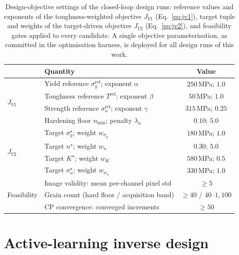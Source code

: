 \documentclass[preprint,12pt]{elsarticle}
\begin{document}
\begin{table}[!t]
\centering
\caption{Design-objective settings of the closed-loop design runs: reference values and exponents of the toughness-weighted objective $J_{V1}$ (Eq.~\eqref{eq:jv1}), target tuple and weights of the target-driven objective $J_{V2}$ (Eq.~\eqref{eq:jv2}), and feasibility gates applied to every candidate. A single objective parameterisation, as committed in the optimisation harness, is deployed for all design runs of this work.}
\label{tab:objectives}
\renewcommand{\arraystretch}{1.15}
\begin{tabular}{l l c}
\toprule
 & Quantity & Value \\
\midrule
\multirow{4}{*}{$J_{V1}$}
 & Yield reference $\sigma_y^{\mathrm{ref}}$; exponent $\alpha$ & $250$\,MPa; $1.0$ \\
 & Toughness reference $T^{\mathrm{ref}}$; exponent $\beta$ & $50$\,MPa; $1.0$ \\
 & Strength reference $\sigma_u^{\mathrm{ref}}$; exponent $\gamma$ & $315$\,MPa; $0.25$ \\
 & Hardening floor $n_{\min}$; penalty $\lambda_n$ & $0.10$; $5.0$ \\
\midrule
\multirow{4}{*}{$J_{V2}$}
 & Target $\sigma_y^\star$; weight $w_{\sigma_y}$ & $180$\,MPa; $1.0$ \\
 & Target $n^\star$; weight $w_n$ & $0.30$; $5.0$ \\
 & Target $K^\star$; weight $w_K$ & $580$\,MPa; $0.5$ \\
 & Target $\sigma_u^\star$; weight $w_{\sigma_u}$ & $330$\,MPa; $1.0$ \\
\midrule
\multirow{3}{*}{Feasibility}
 & Image validity: mean per-channel pixel std & $\geq 5$ \\
 & Grain count (hard floor / acquisition band) & $\geq 40$ / $40$--$1{,}100$ \\
 & CP convergence: converged increments & $\geq 50$ \\
\bottomrule
\end{tabular}
\end{table}

\section{Active-learning inverse design}
\label{sec:meridian}
\end{document}
